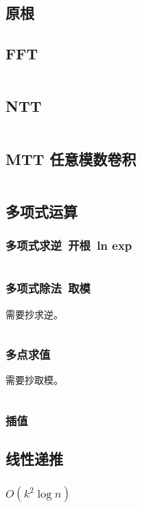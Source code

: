 \documentclass[titlepage, a4paper, 11pt]{article}
\begin{document}
\begin{spacing}{1.15}
				\subsection{原根}
					
				\subsection{FFT}
					\inputminted{cpp}{src/Math/FFT.cpp}
				\subsection{NTT}
					\inputminted{cpp}{src/Math/NTT.cpp}
				\subsection{MTT 任意模数卷积}
					\inputminted{cpp}{src/Math/MTT.cpp}
				\subsection{多项式运算}
					\subsubsection{多项式求逆\ 开根\ ln exp}
						\inputminted{cpp}{src/Math/多项式运算.cpp}
					\subsubsection{多项式除法\ 取模}
						需要抄求逆。
						\inputminted{cpp}{src/Math/多项式取模.cpp}
					\subsubsection{多点求值}
						需要抄取模。
						\inputminted{cpp}{src/Math/多点求值.cpp}
					\subsubsection{插值}
						
				\subsection{线性递推}
					\subsubsection*{$O(k^2 \log n)$}
						\inputminted{cpp}{src/Math/线性递推.cpp}

\end{spacing}
\end{document}
